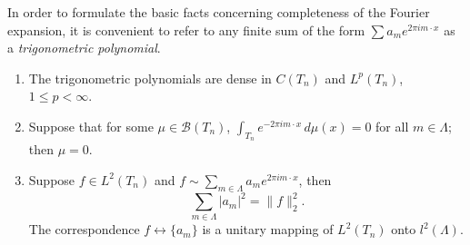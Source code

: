 In order to formulate the basic facts concerning completeness of the Fourier expansion, it is convenient to refer to any finite sum of the form $\sum a_m e^{2\pi i m \cdot x}$ as a \emph{trigonometric polynomial}.

\begin{theorem}\label{thm:c7-1-7}
\begin{enumerate}
\item[(i)] The trigonometric polynomials are dense in $C(T_n)$ and $L^p(T_n)$, $1 \leq p < \infty$.
\item[(ii)] Suppose that for some $\mu \in \mathcal{B}(T_n)$, $\int_{T_n} e^{-2\pi i m \cdot x}\,d\mu(x) = 0$ for all $m \in \Lambda$; then $\mu = 0$.
\item[(iii)] Suppose $f \in L^2(T_n)$ and $f \sim \sum_{m \in \Lambda} a_m e^{2\pi i m \cdot x}$, then
\[
\sum_{m \in \Lambda} |a_m|^2 = \|f\|_2^2.
\]
The correspondence $f \leftrightarrow \{a_m\}$ is a unitary mapping of $L^2(T_n)$ onto $l^2(\Lambda)$.
\end{enumerate}
\end{theorem}

